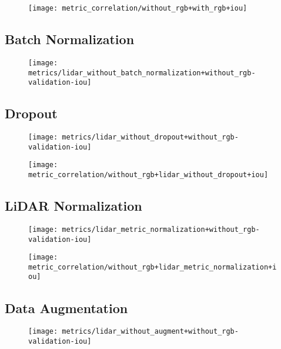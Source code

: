 \begin{figure}[H]
  \centering
  \texttt{[image: metric\_correlation/without\_rgb+with\_rgb+iou]}
\end{figure}

\subsection{Batch Normalization}

\begin{figure}[H]
  \centering
  \texttt{[image: metrics/lidar\_without\_batch\_normalization+without\_rgb-validation-iou]}
\end{figure}

\subsection{Dropout}

\begin{figure}[H]
  \centering
  \texttt{[image: metrics/lidar\_without\_dropout+without\_rgb-validation-iou]}
\end{figure}

\begin{figure}[H]
  \centering
  \texttt{[image: metric\_correlation/without\_rgb+lidar\_without\_dropout+iou]}
\end{figure}

\subsection{LiDAR Normalization}

\begin{figure}[H]
  \centering
  \texttt{[image: metrics/lidar\_metric\_normalization+without\_rgb-validation-iou]}
\end{figure}

\begin{figure}[H]
  \centering
  \texttt{[image: metric\_correlation/without\_rgb+lidar\_metric\_normalization+iou]}
\end{figure}

\subsection{Data Augmentation}

\begin{figure}[H]
  \centering
  \texttt{[image: metrics/lidar\_without\_augment+without\_rgb-validation-iou]}
\end{figure}

